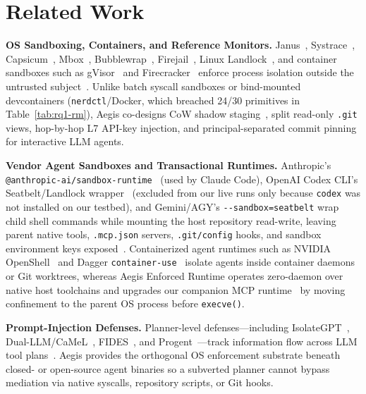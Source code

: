 \documentclass[10pt,journal,compsoc]{IEEEtran}
\begin{document}
\section{Related Work}
\label{sec:related}

\noindent\textbf{OS Sandboxing, Containers, and Reference Monitors.}
Janus~\cite{goldberg1996secure}, Systrace~\cite{provos2003systrace}, Capsicum~\cite{watson2010capsicum}, Mbox~\cite{kim2013mbox}, Bubblewrap~\cite{containers2024bubblewrap}, Firejail~\cite{netblue2024firejail}, Linux Landlock~\cite{salaun2021landlock}, and container sandboxes such as gVisor~\cite{young2019gvisor} and Firecracker~\cite{agache2020firecracker} enforce process isolation outside the untrusted subject~\cite{anderson1972computer,saltzer1975protection}. Unlike batch syscall sandboxes or bind-mounted devcontainers (\texttt{nerdctl}/Docker, which breached 24/30 primitives in Table~\ref{tab:rq1-rm}), Aegis co-designs CoW shadow staging~\cite{nightingale2005speculator,porter2009txos,wright2004unionfs}, split read-only \texttt{.git} views, hop-by-hop L7 API-key injection, and principal-separated commit pinning for interactive LLM agents.

\noindent\textbf{Vendor Agent Sandboxes and Transactional Runtimes.}
Anthropic's \texttt{@anthropic-ai/sandbox-runtime}~\cite{anthropic2025srt} (used by Claude Code), OpenAI Codex CLI's Seatbelt/Landlock wrapper~\cite{openai2025codex} (excluded from our live runs only because \texttt{codex} was not installed on our testbed), and Gemini/AGY's \texttt{-\/-sandbox=seatbelt} wrap child shell commands while mounting the host repository read-write, leaving parent native tools, \texttt{.mcp.json} servers, \texttt{.git/config} hooks, and sandbox environment keys exposed~\cite{checkpoint2026hook,nvd2026agentfs,nvd2026fsmonitor}. Containerized agent runtimes such as NVIDIA OpenShell~\cite{nvidia2026openshell} and Dagger \texttt{container-use}~\cite{dagger2025containeruse} isolate agents inside container daemons or Git worktrees, whereas Aegis Enforced Runtime operates zero-daemon over native host toolchains and upgrades our companion MCP runtime~\cite{zhao2026aegisos} by moving confinement to the parent OS process before \texttt{execve()}.

\noindent\textbf{Prompt-Injection Defenses.}
Planner-level defenses---including IsolateGPT~\cite{wu2024secgpt}, Dual-LLM/CaMeL~\cite{debenedetti2025camel,willison2023dualllm}, FIDES~\cite{costa2025fides}, and Progent~\cite{shi2025progent}---track information flow across LLM tool plans~\cite{debenedetti2024agentdojo,zhan2024injecagent}. Aegis provides the orthogonal OS enforcement substrate beneath closed- or open-source agent binaries so a subverted planner cannot bypass mediation via native syscalls, repository scripts, or Git hooks.
\end{document}
